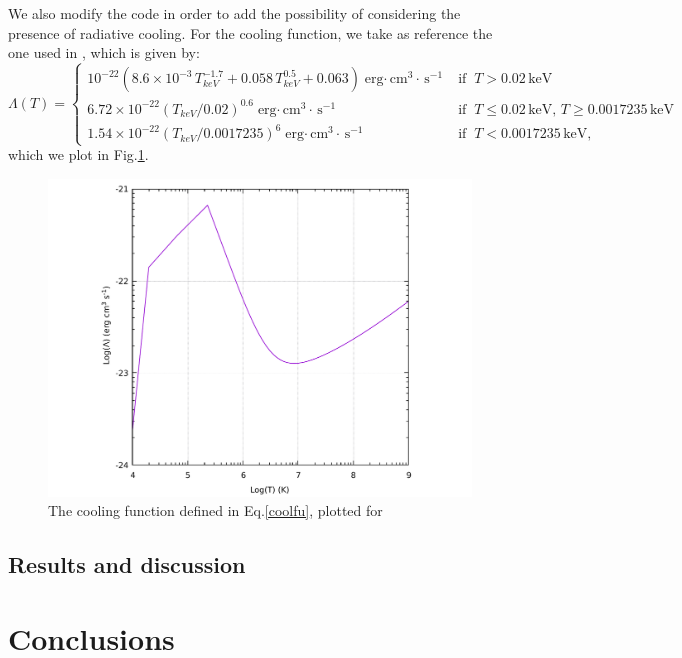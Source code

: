\documentclass{article}
\begin{document}
We also modify the code in order to add the possibility of considering the presence of radiative cooling. For the cooling function, we take as reference the one used in \cite{sharma}, which is given by:
\begin{equation}\label{coolfu}
	\Lambda(T)=
	\begin{cases}
		10^{-22}(8.6\times 10^{-3}\,T_{keV}^{-1.7}+0.058\,T_{keV}^{0.5}+0.063)\;\text{erg$\cdot\,$cm$^3\cdot\,$s$^{-1}$} \; &\text{if} \; \;T>0.02\,\text{keV}\\
		6.72\times 10^{-22}(T_{keV}/0.02)^{0.6}\;\text{erg$\cdot\,$cm$^3\cdot\,$s$^{-1}$} \; &\text{if} \; \;T\le0.02\,\text{keV, }T\ge0.0017235\,\text{keV}\\
		1.54\times 10^{-22}(T_{keV}/0.0017235)^{6}\;\text{erg$\cdot\,$cm$^3\cdot\,$s$^{-1}$} \; &\text{if} \; \;T<0.0017235\,\text{keV},
	\end{cases}
\end{equation}
which we plot in Fig.\ref{fig:coolf}.

\begin{figure}[H]
	\centering
	\includegraphics[width=0.7 \linewidth]{coolfunction.pdf}
	\caption{The cooling function defined in Eq.\eqref{coolfu}, plotted for}
	\label{fig:coolf}
\end{figure}

\subsection{Results and discussion}

\section*{Conclusions}
\end{document}

